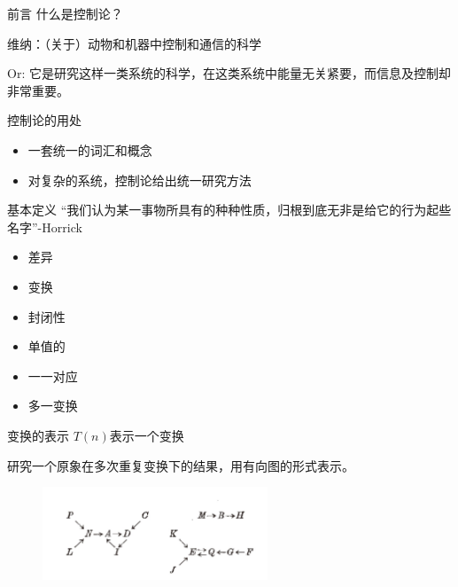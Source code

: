 \documentclass[12pt,AutoFakeBold,aspectratio=43,mathserif]{beamer}
\begin{document}
    	\begin{frame}{前言}
    		什么是控制论？
    		
    		维纳：（关于）动物和机器中控制和通信的科学
    		
    		Or: 它是研究这样一类系统的科学，在这类系统中能量无关紧要，而信息及控制却非常重要。
    		
    		\end{frame}
    	\begin{frame}{控制论的用处}
    		\begin{itemize}
    			\item 一套统一的词汇和概念
    			
    			\item 对复杂的系统，控制论给出统一研究方法
    
    		\end{itemize}
    	\end{frame}
    	\begin{frame}{基本定义}
    			“我们认为某一事物所具有的种种性质，归根到底无非是给它的行为起些名字”-Horrick
    	
    		\begin{itemize}
    			\item 差异
    			\item 变换
    			\item 封闭性
    			\item 单值的
    			\item 一一对应
    			\item 多一变换
    		\end{itemize}
    	\end{frame}
    	\begin{frame}{变换的表示}
    		$T(n)$表示一个变换
    		
    		研究一个原象在多次重复变换下的结果，用有向图的形式表示。
            \begin{figure}
                \centering
                \includegraphics[width=0.6\textwidth]{figures/figure1_2.jpg}
            \end{figure}
    		\end{frame}
\end{document}
